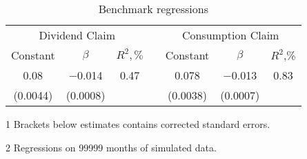 \begin{comment}
 (1) & 0.07842 & -0.01328 & & 0.0083 & 0.0015 \\
& (0.0038) & (0.00067) & \\

 \addlinespace 
  (2) & 0.08021 & &  -0.01355 &0.0047 & 0.0032\\ 
               & (0.0044)& & (0.00078) \\ 
 \addlinespace 

\bottomrule 
\end{tabular} 
\begin{tablenotes}
\footnotesize{
\item[1] Brackets below estimates contains \citet{NW87} corrected standard errors. 
\item[2] Regressions on 99999 months of simulated data.
\item[3] EXP (REC) denotes expansion (recession)
}
\end{tablenotes}
\end{threeparttable}
\end{table} 
\end{comment}

\begin{table}[]
\centering
  \caption{Benchmark regressions}           
  \label{tab:regress1}
\begin{threeparttable}
\begin{tabular}{@{}ccccccc@{}}
\toprule
  \multicolumn{3}{c}{Dividend Claim} && \multicolumn{3}{c}{Consumption Claim} \\ 
\addlinespace
Constant  & $\beta$  &  $R^2,\%$     && Constant & $\beta$   &  $R^2$,\%      \\
\cmidrule(lr){1-3} \cmidrule(lr){5-7}
0.08      & $-$0.014 & 0.47          && 0.078    & $-$0.013  & 0.83           \\ 
\addlinespace
(0.0044)  & (0.0008) &               && (0.0038) & (0.0007)  &                \\
\bottomrule
\end{tabular}
\begin{tablenotes}\footnotesize{
\item[1] Brackets below estimates contains \citet{NW87} corrected standard errors. 
\item[2] Regressions on 99999 months of simulated data.
}
\end{tablenotes}
\end{threeparttable}
\end{table}